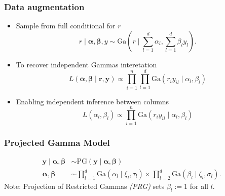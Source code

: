 \documentclass[aspectratio=169]{beamer}
\begin{document}
\begin{frame}
  \frametitle{Data augmentation}
  \begin{itemize}
    \item Sample from full conditional for $r$
      \begin{equation*}
        r\mid\bm{ \alpha},\bm{ \beta}, y \sim \text{Ga}\left(r\mid{\textstyle\sum}_{l = 1}^d \alpha_l,
              {\textstyle\sum}_{l = 1}^d \beta_ly_l\right).
      \end{equation*}
    \pause
    \item To recover independent Gammas interetation
      \begin{equation*}
        L(\bm{\alpha},\bm{\beta} \mid \bm{r},\bm{y}) \propto
            \prod_{i = 1}^n\prod_{l = 1}^{d}\text{Ga}\left(r_iy_{il}\mid\alpha_l,\beta_l\right)
      \end{equation*}
    \pause
    \item Enabling independent inference between columns
      \begin{equation*}
        L(\alpha_l,\beta_l) \propto \prod_{i = 1}^n
                  \text{Ga}\left(r_iy_{il}\mid\alpha_l,\beta_l\right)
      \end{equation*}
  \end{itemize}
\end{frame} %
\begin{frame}
  \frametitle{Projected Gamma Model}
  \begin{equation*}
    \begin{aligned}
      \bm{ y}\mid\bm{\alpha},\bm{\beta} &\sim \text{PG}(\bm{ y}\mid\bm{\alpha},\bm{\beta})\\
      \bm{ \alpha},\bm{\beta} &\sim {\textstyle \prod}_{l = 1}^d \text{Ga}(\alpha_l \mid \xi_l,\tau_l)
              \times {\textstyle \prod}_{l = 2}^d \text{Ga}(\beta_l\mid \zeta_l,\sigma_l).
    \end{aligned}
  \end{equation*}
  \vfill
  {\small Note: Projection of Restricted Gammas \emph{(PRG)} sets $\beta_l := 1$ for all $l$.}
\end{frame} %
\end{document}
